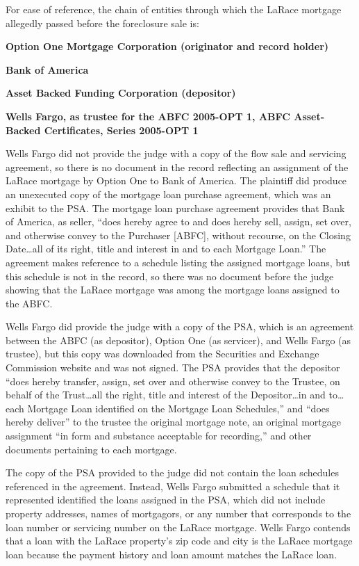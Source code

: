 For ease of reference, the chain of entities through which the LaRace mortgage
allegedly passed before the foreclosure sale is:
\begin{center}
\textbf{Option One Mortgage Corporation (originator and record holder)}

\textdownarrow

\textbf{Bank of America}

\textdownarrow

\textbf{Asset Backed Funding Corporation (depositor)}

\textdownarrow

\textbf{Wells Fargo, as trustee for the ABFC 2005-OPT 1, ABFC Asset-Backed
Certificates, Series 2005-OPT 1}
\end{center}
Wells Fargo did not provide the judge with a copy of the flow sale and servicing
agreement, so there is no document in the record reflecting an assignment of
the LaRace mortgage by Option One to Bank of America. The plaintiff did produce
an unexecuted copy of the mortgage loan purchase agreement, which was an
exhibit to the PSA. The mortgage loan purchase agreement provides that Bank of
America, as seller, ``does hereby agree to and does hereby sell, assign, set
over, and otherwise convey to the Purchaser [ABFC], without recourse, on the
Closing Date\dots all of its right, title and interest in and to each
Mortgage Loan.'' The agreement makes reference to a schedule listing the
assigned mortgage loans, but this schedule is not in the record, so there was
no document before the judge showing that the LaRace mortgage was among the
mortgage loans assigned to the ABFC.

Wells Fargo did provide the judge with a copy of the PSA, which is an agreement
between the ABFC (as depositor), Option One (as servicer), and Wells Fargo (as
trustee), but this copy was downloaded from the Securities and Exchange
Commission website and was not signed. The PSA provides that the depositor
``does hereby transfer, assign, set over and otherwise convey to the Trustee,
on behalf of the Trust\dots all the right, title and interest of the
Depositor\dots in and to\dots each Mortgage Loan identified on the
Mortgage Loan Schedules,'' and ``does hereby deliver'' to the trustee the
original mortgage note, an original mortgage assignment ``in form and substance
acceptable for recording,'' and other documents pertaining to each mortgage.

The copy of the PSA provided to the judge did not contain the loan schedules
referenced in the agreement. Instead, Wells Fargo submitted a schedule that it
represented identified the loans assigned in the PSA, which did not include
property addresses, names of mortgagors, or any number that corresponds to the
loan number or servicing number on the LaRace mortgage. Wells Fargo contends
that a loan with the LaRace property's zip code and city is the LaRace mortgage
loan because the payment history and loan amount matches the LaRace loan.

